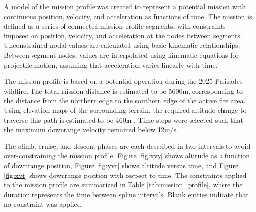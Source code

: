 \documentclass[doublespace,nopageskip]{VTthesis}
\begin{document}
		A model of the mission profile was created to represent a potential mission with continuous position, velocity, and acceleration as functions of time. The mission is defined as a series of connected mission profile segments, with constraints imposed on position, velocity, and acceleration at the nodes between segments. Unconstrained nodal values are calculated using basic kinematic relationships. Between segment nodes, values are interpolated using kinematic equations for projectile motion, assuming that acceleration varies linearly with time.
		
		The mission profile is based on a potential operation during the 2025 Palisades wildfire. The total mission distance is estimated to be 5600m, corresponding to the distance from the northern edge to the southern edge of the active fire area. Using elevation maps of the surrounding terrain, the required altitude change to traverse this path is estimated to be 460m \cite{MapViewer}. Time steps were selected such that the maximum downrange velocity remained below 12m/s.
		
		The climb, cruise, and descent phases are each described in two intervals to avoid over-constraining the mission profile. Figure \ref{fig:xvy} shows altitude as a function of downrange position, Figure \ref{fig:yvt} shows altitude versus time, and Figure \ref{fig:xvt} shows downrange position with respect to time. The constraints applied to the mission profile are summarized in Table \ref{tab:mission_profile}, where the duration represents the time between spline intervals. Blank entries indicate that no constraint was applied.
		
\end{document}
